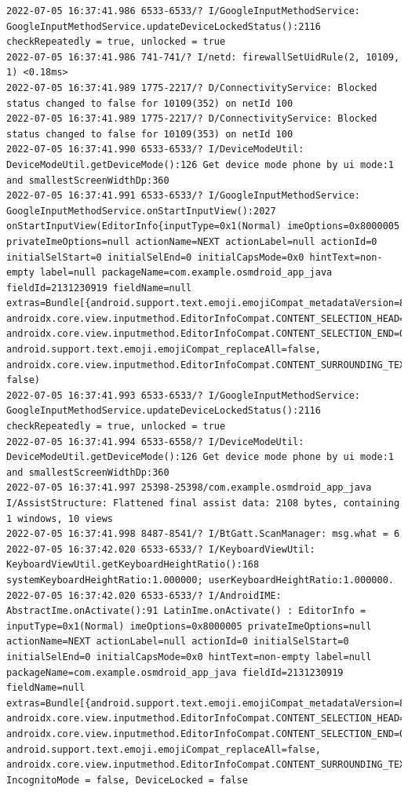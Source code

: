 \documentclass[a4paper,12pt]{book}
\begin{document}
\begin{lstlisting}
2022-07-05 16:37:41.986 6533-6533/? I/GoogleInputMethodService: GoogleInputMethodService.updateDeviceLockedStatus():2116 checkRepeatedly = true, unlocked = true
2022-07-05 16:37:41.986 741-741/? I/netd: firewallSetUidRule(2, 10109, 1) <0.18ms>
2022-07-05 16:37:41.989 1775-2217/? D/ConnectivityService: Blocked status changed to false for 10109(352) on netId 100
2022-07-05 16:37:41.989 1775-2217/? D/ConnectivityService: Blocked status changed to false for 10109(353) on netId 100
2022-07-05 16:37:41.990 6533-6533/? I/DeviceModeUtil: DeviceModeUtil.getDeviceMode():126 Get device mode phone by ui mode:1 and smallestScreenWidthDp:360
2022-07-05 16:37:41.991 6533-6533/? I/GoogleInputMethodService: GoogleInputMethodService.onStartInputView():2027 onStartInputView(EditorInfo{inputType=0x1(Normal) imeOptions=0x8000005 privateImeOptions=null actionName=NEXT actionLabel=null actionId=0 initialSelStart=0 initialSelEnd=0 initialCapsMode=0x0 hintText=non-empty label=null packageName=com.example.osmdroid_app_java fieldId=2131230919 fieldName=null extras=Bundle[{android.support.text.emoji.emojiCompat_metadataVersion=8, androidx.core.view.inputmethod.EditorInfoCompat.CONTENT_SELECTION_HEAD=0, androidx.core.view.inputmethod.EditorInfoCompat.CONTENT_SELECTION_END=0, android.support.text.emoji.emojiCompat_replaceAll=false, androidx.core.view.inputmethod.EditorInfoCompat.CONTENT_SURROUNDING_TEXT=}]}, false)
2022-07-05 16:37:41.993 6533-6533/? I/GoogleInputMethodService: GoogleInputMethodService.updateDeviceLockedStatus():2116 checkRepeatedly = true, unlocked = true
2022-07-05 16:37:41.994 6533-6558/? I/DeviceModeUtil: DeviceModeUtil.getDeviceMode():126 Get device mode phone by ui mode:1 and smallestScreenWidthDp:360
2022-07-05 16:37:41.997 25398-25398/com.example.osmdroid_app_java I/AssistStructure: Flattened final assist data: 2108 bytes, containing 1 windows, 10 views
2022-07-05 16:37:41.998 8487-8541/? I/BtGatt.ScanManager: msg.what = 6
2022-07-05 16:37:42.020 6533-6533/? I/KeyboardViewUtil: KeyboardViewUtil.getKeyboardHeightRatio():168 systemKeyboardHeightRatio:1.000000; userKeyboardHeightRatio:1.000000.
2022-07-05 16:37:42.020 6533-6533/? I/AndroidIME: AbstractIme.onActivate():91 LatinIme.onActivate() : EditorInfo = inputType=0x1(Normal) imeOptions=0x8000005 privateImeOptions=null actionName=NEXT actionLabel=null actionId=0 initialSelStart=0 initialSelEnd=0 initialCapsMode=0x0 hintText=non-empty label=null packageName=com.example.osmdroid_app_java fieldId=2131230919 fieldName=null extras=Bundle[{android.support.text.emoji.emojiCompat_metadataVersion=8, androidx.core.view.inputmethod.EditorInfoCompat.CONTENT_SELECTION_HEAD=0, androidx.core.view.inputmethod.EditorInfoCompat.CONTENT_SELECTION_END=0, android.support.text.emoji.emojiCompat_replaceAll=false, androidx.core.view.inputmethod.EditorInfoCompat.CONTENT_SURROUNDING_TEXT=}], IncognitoMode = false, DeviceLocked = false

\end{lstlisting}
\end{document}
